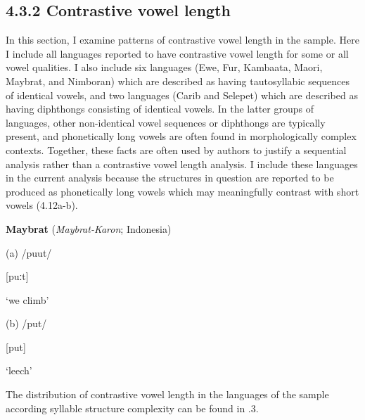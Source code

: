 \subsection{4.3.2 Contrastive vowel length}

  In this section, I examine patterns of contrastive vowel length in the sample. Here I include all languages reported to have contrastive vowel length for some or all vowel qualities. I also include six languages (Ewe, Fur, Kambaata, Maori, Maybrat, and Nimboran) which are described as having tautosyllabic sequences of identical vowels, and two languages (Carib and Selepet) which are described as having diphthongs consisting of identical vowels. In the latter groups of languages, other non-identical vowel sequences or diphthongs are typically present, and phonetically long vowels are often found in morphologically complex contexts. Together, these facts are often used by authors to justify a sequential analysis rather than a contrastive vowel length analysis. I include these languages in the current analysis because the structures in question are reported to be produced as phonetically long vowels which may meaningfully contrast with short vowels (4.12a-b).



\ea\label{ex:(4.12)}
   \textbf{Maybrat} (\textit{Maybrat-Karon}; Indonesia)



(a)  /puut/



  [puːt]



  ‘we climb’



(b)  /put/



  [put]



  ‘leech’



\citep[29]{Dol2007}

\z


  The distribution of contrastive vowel length in the languages of the sample according syllable structure complexity can be found in .3.






